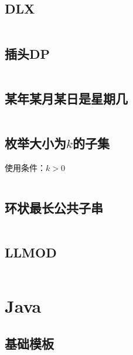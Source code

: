 \documentclass[a4paper]{article}
\newcommand{\cppcode}[1]{
    \inputminted[mathescape,
    frame=lines,linenos]{cpp}{source/#1}
}
\begin{document}
\subsection{DLX}
\cppcode{miscellany/DLX.cpp}

\subsection{插头DP}
\cppcode{miscellany/plugdp.cpp}


\subsection{某年某月某日是星期几}

\cppcode{miscellany/what-day-is-today.cpp}

\subsection{枚举大小为$k$的子集}

使用条件：$k > 0$

\cppcode{miscellany/subset-of-size-k.cpp}

\subsection{环状最长公共子串}

\cppcode{miscellany/cyclic-longest-common-string.cpp}

\subsection{LLMOD}

\cppcode{miscellany/LLMOD.cpp}



\section{Java}

\subsection{基础模板}
\end{document}
